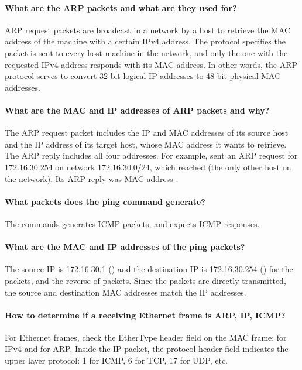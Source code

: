 \documentclass[compilation.tex]{subfiles}
\begin{document}
\paragraph{What are the ARP packets and what are they used for?}
ARP request packets are broadcast in a network by a host to retrieve the MAC address of the machine with a certain IPv4 address.
The protocol specifies the packet is sent to every host machine in the network,
and only the one with the requested IPv4 address responds with its MAC address.
In other words, the ARP protocol serves to convert 32-bit logical IP addresses to 48-bit physical MAC addresses.

\paragraph{What are the MAC and IP addresses of ARP packets and why?}
The ARP request packet includes the IP and MAC addresses of its source host and the IP address of its target host, whose MAC address it wants to retrieve. The ARP reply includes all four addresses.
For example,  sent an ARP request for 172.16.30.254 on network 172.16.30.0/24, which reached  (the only other host on the network). Its ARP reply was MAC address .

\paragraph{What packets does the ping command generate?}
The  commands generates ICMP  packets, and expects ICMP  responses.

\paragraph{What are the MAC and IP addresses of the ping packets?}
The source IP is 172.16.30.1 () and the destination IP is 172.16.30.254 () for the  packets, and the reverse of  packets.
Since the packets are directly transmitted, the source and destination MAC addresses match the IP addresses.

\paragraph{How to determine if a receiving Ethernet frame is ARP, IP, ICMP?} 
For Ethernet frames, check the EtherType header field on the MAC frame:  for IPv4 and  for ARP. Inside the IP packet, the protocol header field indicates the upper layer protocol: 1 for ICMP, 6 for TCP, 17 for UDP, etc.
\end{document}
